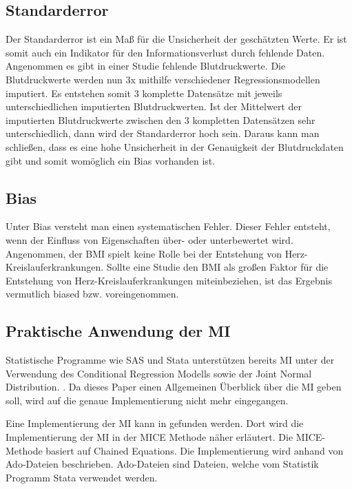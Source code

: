 \subsection{Standarderror}

Der Standarderror ist ein Maß für die Unsicherheit der 
geschätzten Werte. \autocite[1098]{Donders2006} Er ist somit auch ein Indikator für den Informationsverlust durch fehlende Daten. \autocite[1298]{Hughes2019}
Angenommen es gibt in einer Studie fehlende Blutdruckwerte. Die Blutdruckwerte werden nun 3x mithilfe verschiedener Regressionsmodellen imputiert.
Es entstehen somit 3 komplette Datensätze mit jeweils unterschiedlichen imputierten Blutdruckwerten. Ist der Mittelwert der imputierten Blutdruckwerte zwischen den 3 kompletten
Datensätzen sehr unterschiedlich, dann wird der Standarderror hoch sein. Daraus kann man schließen, dass es eine hohe Unsicherheit in der Genauigkeit der Blutdruckdaten gibt und
somit womöglich ein Bias vorhanden ist.   

\subsection{Bias}

Unter Bias versteht man einen systematischen Fehler. Dieser Fehler entsteht, 
wenn der Einfluss von Eigenschaften über- oder unterbewertet wird. \autocite[2]{Jakobsen2017} Angenommen, der BMI 
spielt keine Rolle bei der Entstehung von Herz-Kreislauferkrankungen. Sollte eine Studie den BMI als großen Faktor 
für die Entstehung von Herz-Kreislauferkrankungen miteinbeziehen, ist das Ergebnis vermutlich biased bzw. voreingenommen.

\subsection{Praktische Anwendung der MI}

Statistische Programme wie SAS und Stata unterstützen bereits MI unter der Verwendung des Conditional Regression Modells 
sowie der Joint Normal Distribution. \autocite[164]{Lee2014}. Da dieses Paper einen Allgemeinen Überblick über die MI 
geben soll, wird auf die genaue Implementierung nicht mehr eingegangen. 

Eine Implementierung der MI kann in \textcite[]{Royston2005} gefunden werden. Dort wird die Implementierung der MI in der MICE Methode 
näher erläutert. Die MICE-Methode basiert auf Chained Equations. Die Implementierung wird anhand von Ado-Dateien beschrieben.
Ado-Dateien sind Dateien, welche vom Statistik Programm Stata verwendet werden.

